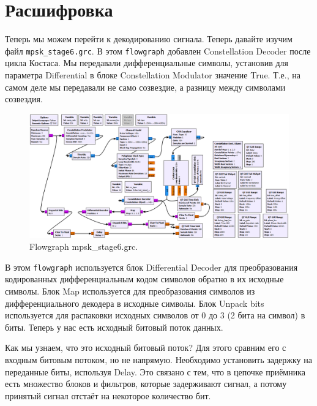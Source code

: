 \documentclass[a4paper, 14pt]{extarticle}
\begin{document}
    \newpage

    \section{Расшифровка}
    \label{sec:task7}

    Теперь мы можем перейти к декодированию сигнала.
    Теперь давайте изучим файл \texttt{mpsk\_stage6.grc}.
    В этом \texttt{flowgraph} добавлен Constellation Decoder после цикла Костаса.
    Мы передавали дифференциальные символы, установив для параметра Differential в блоке
    Constellation Modulator значение True. Т.е., на самом деле мы передавали не само созвездие, а разницу
    между символами созвездия.

    \begin{figure}[h]
        \centering
        \includegraphics[width=0.9\linewidth]{resources/Images/task7_mpsk_stage6}
        \caption{Flowgraph mpsk\_stage6.grc.}
        \label{fig:task7_mpsk_stage6}
    \end{figure}

    В этом \texttt{flowgraph} используется блок Differential Decoder для преобразования кодированных
    дифференциальным кодом символов обратно в их исходные символы.
    Блок Map используется для преобразования символов из дифференциального декодера в исходные символы.
    Блок Unpack bits используется для распаковки исходных символов от 0 до 3 (2 бита на символ) в биты.
    Теперь у нас есть исходный битовый поток данных.

    Как мы узнаем, что это исходный битовый поток?
    Для этого сравним его с входным битовым потоком, но не напрямую.
    Необходимо установить задержку на переданные биты, используя Delay.
    Это связано с тем, что в цепочке приёмника есть множество блоков и фильтров, которые задерживают сигнал,
    а потому принятый сигнал отстаёт на некоторое количество бит.
\end{document}
